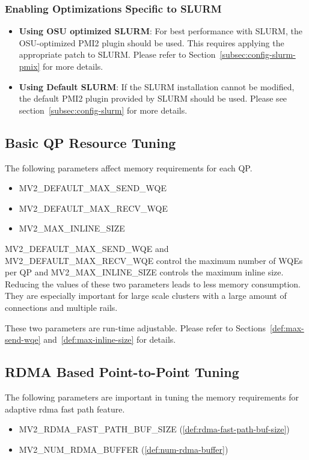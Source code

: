 \subsubsection{Enabling Optimizations Specific to SLURM}

\begin{itemize}
\item \textbf{Using OSU optimized SLURM}:
For best performance with SLURM, the OSU-optimized PMI2 plugin should be used.
This requires applying the appropriate patch to SLURM. Please refer to
Section~\ref{subsec:config-slurm-pmix} for more details.

\item \textbf{Using Default SLURM}:
If the SLURM installation cannot be modified, the default PMI2 plugin provided
by SLURM should be used. Please see section~\ref{subsec:config-slurm} for more
details.
\end{itemize}


\subsection{Basic QP Resource Tuning}
The following parameters affect memory requirements for each QP.

\begin{itemize}
\item{MV2\_DEFAULT\_MAX\_SEND\_WQE}
\item{MV2\_DEFAULT\_MAX\_RECV\_WQE}
\item{MV2\_MAX\_INLINE\_SIZE}
\end{itemize}

MV2\_DEFAULT\_MAX\_SEND\_WQE and MV2\_DEFAULT\_MAX\_RECV\_WQE 
control the maximum number of WQEs per QP and 
MV2\_MAX\_INLINE\_SIZE controls the maximum inline size. Reducing the
values of these two parameters leads to less memory consumption. They are 
especially important for large scale clusters with a large amount of connections
and multiple rails.

These two parameters are run-time adjustable. Please refer to 
Sections~\ref{def:max-send-wqe} and~\ref{def:max-inline-size} for details.


\subsection{RDMA Based Point-to-Point Tuning}
The following parameters are important in tuning the memory requirements for
adaptive rdma fast path feature.
\begin{itemize}
\item{MV2\_RDMA\_FAST\_PATH\_BUF\_SIZE} (\ref{def:rdma-fast-path-buf-size})
\item{MV2\_NUM\_RDMA\_BUFFER} (\ref{def:num-rdma-buffer})
\end{itemize}

